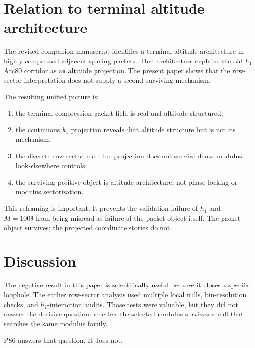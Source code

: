 \documentclass[11pt]{article}
\begin{document}
\section{Relation to terminal altitude architecture}

The revised companion manuscript identifies a terminal altitude architecture in highly compressed adjacent-spacing packets. That architecture explains the old \(h_1\) Arc80 corridor as an altitude projection. The present paper shows that the row-sector interpretation does not supply a second surviving mechanism.

The resulting unified picture is:
\begin{enumerate}
    \item the terminal compression packet field is real and altitude-structured;
    \item the continuous \(h_1\) projection reveals that altitude structure but is not its mechanism;
    \item the discrete row-sector modulus projection does not survive dense modulus look-elsewhere controls;
    \item the surviving positive object is altitude architecture, not phase locking or modulus sectorization.
\end{enumerate}

This reframing is important. It prevents the validation failure of \(h_1\) and \(M=1009\) from being misread as failure of the packet object itself. The packet object survives; the projected coordinate stories do not.

\section{Discussion}

The negative result in this paper is scientifically useful because it closes a specific loophole. The earlier row-sector analysis used multiple local nulls, bin-resolution checks, and \(h_1\)-interaction audits. Those tests were valuable, but they did not answer the decisive question: whether the selected modulus survives a null that searches the same modulus family.

P86 answers that question. It does not.
\end{document}
